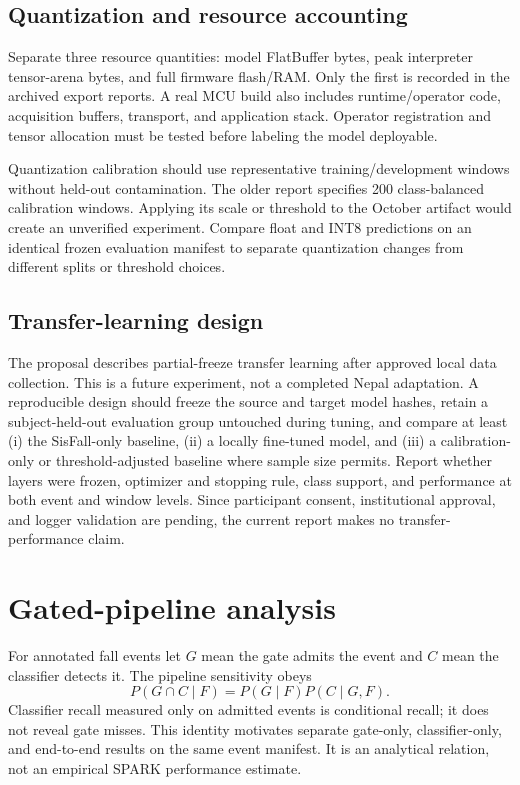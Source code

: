 \subsection{Quantization and resource accounting}
Separate three resource quantities: model FlatBuffer bytes, peak interpreter tensor-arena bytes, and full firmware flash/RAM. Only the first is recorded in the archived export reports. A real MCU build also includes runtime/operator code, acquisition buffers, transport, and application stack. Operator registration and tensor allocation must be tested before labeling the model deployable.

Quantization calibration should use representative training/development windows without held-out contamination. The older report specifies 200 class-balanced calibration windows. Applying its scale or threshold to the October artifact would create an unverified experiment. Compare float and INT8 predictions on an identical frozen evaluation manifest to separate quantization changes from different splits or threshold choices.

\subsection{Transfer-learning design}
The proposal describes partial-freeze transfer learning after approved local data collection. This is a future experiment, not a completed Nepal adaptation. A reproducible design should freeze the source and target model hashes, retain a subject-held-out evaluation group untouched during tuning, and compare at least (i) the SisFall-only baseline, (ii) a locally fine-tuned model, and (iii) a calibration-only or threshold-adjusted baseline where sample size permits. Report whether layers were frozen, optimizer and stopping rule, class support, and performance at both event and window levels. Since participant consent, institutional approval, and logger validation are pending, the current report makes no transfer-performance claim.

\section{Gated-pipeline analysis}
For annotated fall events let $G$ mean the gate admits the event and $C$ mean the classifier detects it. The pipeline sensitivity obeys
\[
 P(G\cap C\mid F)=P(G\mid F)P(C\mid G,F).
\]
Classifier recall measured only on admitted events is conditional recall; it does not reveal gate misses. This identity motivates separate gate-only, classifier-only, and end-to-end results on the same event manifest. It is an analytical relation, not an empirical SPARK performance estimate.

